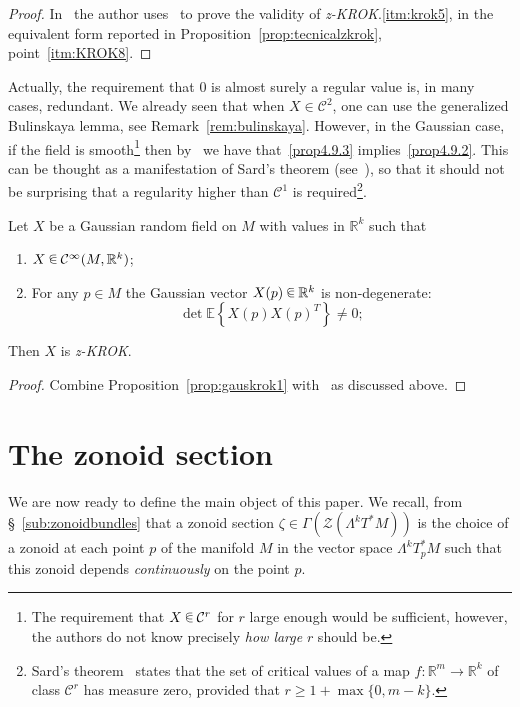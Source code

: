 \documentclass[10pt]{amsart}
\theoremstyle{definition}\newtheorem{defi}[theo]{Definition}\newtheorem{rema}[theo]{Remark}\newtheorem{exam}[theo]{Example}\newtheorem{exem}[theo]{Example}\newtheorem{nota}[theo]{Notation}
\newcommand{\R}{\mathbb{R}}
\newcommand{\EE}{\mathbb{E}}
\newcommand{\ZZ}{\mathscr{Z}}
\newcommand{\mC}{\mathcal{C}}
\newcommand{\zkrok}{\emph{z-KROK}\xspace}
\newcommand*\randin{
\mathchoice {\raisebox{-.35ex}{$\displaystyle{^\subset}$}\mkern-11.5mu\raisebox{+.45ex}{$\displaystyle{_\subset}$}} {\mkern+1mu\raisebox{-.27ex}{$\textstyle{^\subset}$}\mkern-11.7mu\raisebox{+.45ex}{$\textstyle{_\subset}$}} {\raisebox{.35ex}{$\scriptstyle\subset$}\mkern-14mu\raisebox{-.15ex}{$\scriptstyle\subset$}} {\raisebox{.3ex}{$\scriptscriptstyle\subset$}\mkern-13.5mu\raisebox{-.10ex}{$\scriptscriptstyle\subset$}}}
\begin{document}
\begin{proof}
In~\cite[Section~9.1]{KRStec} the author uses~\cite[Lemma~9.1]{KRStec} to prove the validity of \zkrok.\ref{itm:krok5}, in the equivalent form reported in Proposition~\ref{prop:tecnicalzkrok}, point~\eqref{itm:KROK8}.
\end{proof}

Actually, the requirement that $0$ is almost surely a regular value is, in many cases, redundant. We already seen that when $X\in\mC^2$, one can use the generalized Bulinskaya lemma, see Remark~\ref{rem:bulinskaya}. However, in the Gaussian case, if the field is smooth\footnote{The requirement that $X\,\randin\,\mC^r$ for $r$ large enough would be sufficient, however, the authors do not know precisely \emph{how large} $r$ should be.} then by~\cite[Theorem~7]{dtgrf} we have that~\eqref{prop4.9.3} implies~\eqref{prop4.9.2}. This can be thought as a manifestation of Sard's theorem (see~\cite{Hirsch}), so that it should not be surprising that a regularity higher than $\mC^1$ is required\footnote{Sard's theorem~\cite{sard} states that the set of critical values of a map $f\colon \R^m\to\R^k$ of class $\mC^r$ has measure zero, provided that $r\ge 1+\max\{0,m-k\}$.}.

\break
\begin{prop}\label{prop:Gausmthkrok}
Let $X$ be a Gaussian random field on $M$ with values in $\R^k$ such that
\begin{enumerate}
\item\label{prop4.10.1} $X\,\randin\, \mC^\infty(M,\R^k)$;
\item\label{prop4.10.2} For any $p\in M$ the Gaussian vector $X(p)\,\randin\, \R^k$ is non-degenerate:
\[
\det\EE\left\{X(p)X(p)^T\right\}\neq 0;
\]
\end{enumerate}
Then $X$ is \zkrok.
\end{prop}

\begin{proof}
Combine Proposition~\ref{prop:gauskrok1} with~\cite[Theorem~7]{dtgrf} as discussed above.
\end{proof}


\section{The zonoid section}\label{sec:zonoidsection}
We are now ready to define the main object of this paper. We recall, from \S~\ref{sub:zonoidbundles} that a zonoid section $\zeta\in\Gamma(\ZZ(\Lambda^kT^*M))$ is the choice of a zonoid at each point $p$ of the manifold $M$ in the vector space $\Lambda^kT_p^*M$ such that this zonoid depends \emph{continuously} on the point $p$.
\end{document}
